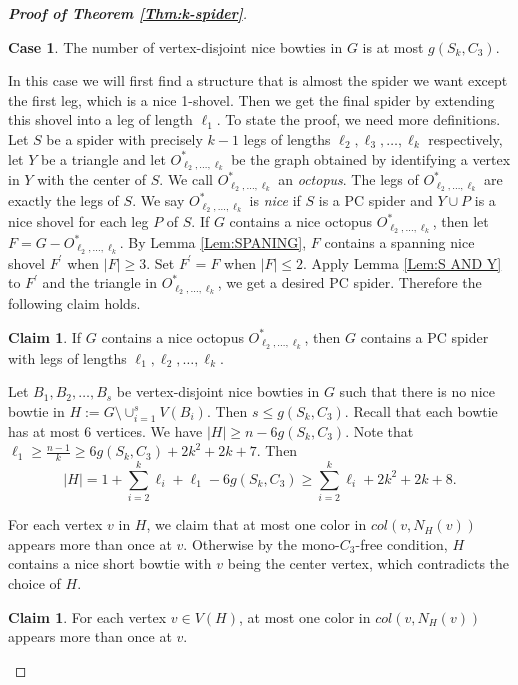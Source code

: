 \documentclass[11pt,a4paper]{article}
\theoremstyle{definition}
\newtheorem{case}{Case}
\newtheorem{claimA}[lemmaA]{Claim}
\begin{document}
\begin{proof}[\textbf{Proof of Theorem \ref{Thm:k-spider}}]
\begin{case}
   The number of vertex-disjoint nice bowties in $G$ is at most $g(S_k,C_3)$.
\end{case}
In this case we will first find a structure that is almost the spider we want except the first leg, which is a nice 1-shovel. Then we get the final spider by extending this shovel into a leg of length $\ell_1$.
To state the proof, we need more definitions.
Let $S$ be a spider with precisely $k-1$ legs of lengths $\ell_2,\ell_3,\ldots,\ell_k$ respectively, let $Y$ be a triangle and let $O^*_{ \ell_2, \ldots, \ell_k}$ be the graph obtained by identifying a vertex in $Y$ with the center of $S$. We call $O^*_{ \ell_2, \ldots, \ell_k}$ an {\it octopus}. The legs of $O^*_{ \ell_2, \ldots, \ell_k}$ are exactly the legs of $S$. We say $O^*_{ \ell_2, \ldots, \ell_k}$ is {\it nice} if $S$ is a PC spider and $Y\cup P$ is a nice shovel for each leg $P$ of $S$. If $G$ contains a {nice} octopus $O^*_{ \ell_2, \ldots, \ell_k}$, then let $F=G-O^*_{ \ell_2, \ldots, \ell_k}$.
By Lemma \ref{Lem:SPANING},  $F$ contains a spanning nice shovel $F^\prime$ when $|F|\geq 3$. Set $F^\prime=F$ when $|F|\leq 2$. Apply Lemma \ref{Lem:S AND Y} to $F^\prime$ and the triangle in $O^*_{ \ell_2, \ldots, \ell_k}$, we get a desired PC spider. Therefore the following claim holds.
\begin{claimA}\label{Cl:octopus}
	If $G$ contains a nice octopus $O^*_{ \ell_2, \ldots, \ell_k}$, then $G$ contains a PC spider with legs of lengths $\ell_1,\ell_2, \ldots, \ell_k$.
\end{claimA}


Let $B_1,B_2,\ldots,B_s$ be vertex-disjoint nice bowties in $G$ such that there is no nice bowtie in $H:=G\setminus \cup_{i=1}^s V(B_i)$. Then $s\leq g(S_k,C_3)$. Recall that each bowtie has at most $6$ vertices. We have $|H|\geq n-6g(S_k,C_3)$. Note that $\ell_1\geq \frac{n-1}{k}\geq 6g(S_k,C_3)+2k^2+2k+7$. Then
$$|H|=1+\sum_{i=2}^k\ell_i+\ell_1-6g(S_k,C_3)\geq \sum_{i=2}^k\ell_i+2k^2+2k+8.$$

For each vertex $v$ in $H$, we claim that at most one color in $col(v,N_{H}(v))$ appears more than once at $v$. Otherwise by the mono-$C_3$-free condition, $H$  contains a nice short bowtie with $v$ being the center vertex, which contradicts the choice of $H$.

\begin{claimA}\label{Cl:color-once}
For each vertex $v\in V(H)$, at most one color in $col(v,N_{H}(v))$ appears more than once at $v$.
\end{claimA}


\end{proof}
\end{document}
